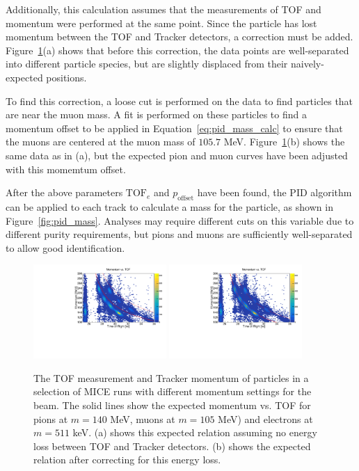 Additionally, this calculation assumes that the measurements of TOF and momentum were performed at the same point.  Since the particle has lost momentum between the TOF and Tracker detectors, a correction must be added.  Figure~\ref{fig:tof_track}(a) shows that before this correction, the data points are well-separated into different particle species, but are slightly displaced from their naively-expected positions.

To find this correction, a loose cut is performed on the data to find particles that are near the muon mass.  A fit is performed on these particles to find a momentum offset to be applied in Equation~\ref{eq:pid_mass_calc} to ensure that the muons are centered at the muon mass of $105.7$ MeV.  Figure~\ref{fig:tof_track}(b) shows the same data as in (a), but the expected pion and muon curves have been adjusted with this momemtum offset.

After the above parameters $\mathrm{TOF}_e$ and $p_\mathrm{offset}$ have been found, the PID algorithm can be applied to each track to calculate a mass for the particle, as shown in Figure~\ref{fig:pid_mass}.  Analyses may require different cuts on this variable due to different purity requirements, but pions and muons are sufficiently well-separated to allow good identification.

\begin{figure}
\includegraphics[width=0.45\textwidth]{07-PID/plots/uncorrected_track_tof.pdf}\hfil
\includegraphics[width=0.45\textwidth]{07-PID/plots/corrected_track_tof.pdf}
\caption{The TOF measurement and Tracker momentum of particles in a selection of MICE runs with different momentum settings for the beam.  The solid lines show the expected momentum vs. TOF for pions at $m=140$ MeV, muons at $m=105$ MeV) and electrons at $m=511$ keV.  (a) shows this expected relation assuming no energy loss between TOF and Tracker detectors.  (b) shows the expected relation after correcting for this energy loss.}
\label{fig:tof_track}
\end{figure}


